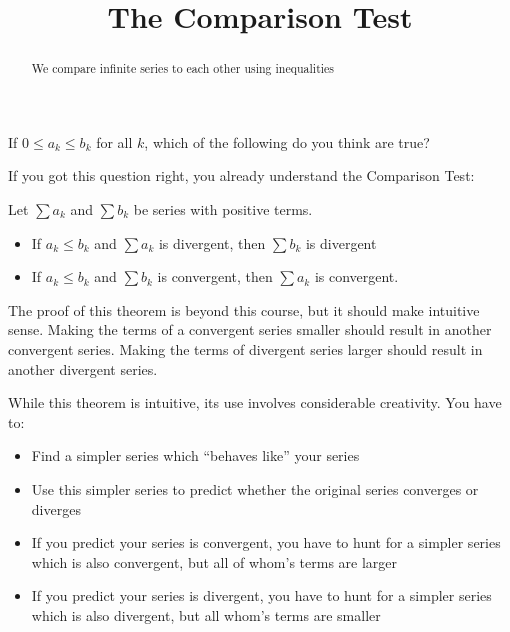 \documentclass{ximera}
\title[Dig-In:]{The Comparison Test}
\begin{document}
\begin{abstract}
We compare infinite series to each other using inequalities
\end{abstract}
\maketitle

\begin{question}
	If  $0 \leq a_k \leq b_k$ for all $k$, which of the following do you think are true?
	
	\begin{multipleChoice}
	\end{multipleChoice}
\end{question}

If you got this question right, you already understand the Comparison Test:

\begin{theorem}
	Let $\sum a_k$ and $\sum b_k$ be series with positive terms.
	
	\begin{itemize}
		\item If $a_k \leq b_k$ and $\sum a_k$ is divergent, then $\sum b_k$ is divergent
		\item If $a_k \leq b_k$ and $\sum b_k$ is convergent, then $\sum a_k$ is convergent.
	\end{itemize}
\end{theorem}

The proof of this theorem is beyond this course, but it should make intuitive sense.  Making the terms of a convergent series smaller should result in another convergent series.  Making the terms of  divergent series larger should result in another divergent series.

While this theorem is intuitive, its use involves considerable creativity.  You have to:

\begin{itemize}
	\item Find a simpler series which ``behaves like'' your series 
	\item Use this simpler series to predict whether the original series converges or diverges
	\item If you predict your series is convergent, you have to hunt for a simpler series which is also convergent, but all of whom's  terms are larger
	\item If you predict your series is divergent, you have to hunt for a simpler series which is also divergent, but all whom's terms are smaller
\end{itemize}
\end{document}
